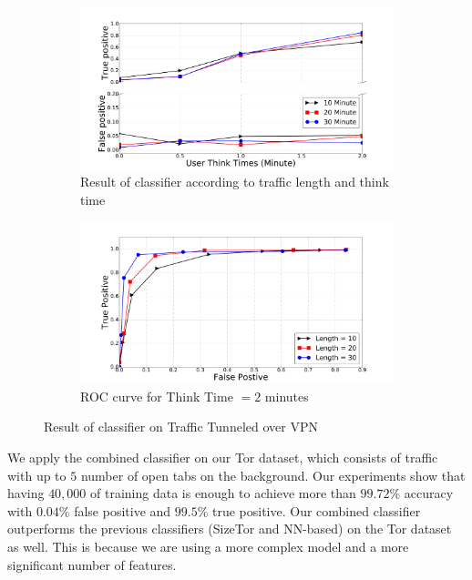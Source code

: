 \begin{figure}[!t]
\begin{subfigure}{.48\linewidth}
\centering
\includegraphics[width=\linewidth]{image/jan25/vpn_d2u.pdf}
\caption{Result of  classifier according to traffic length and think time}
\label{fig:tp}
\end{subfigure}
\centering
\begin{subfigure}{.48\linewidth}
\includegraphics[width=\linewidth]{image/jan25/roc_vpn_d2u.pdf}
\caption{ROC curve for Think Time $=2$ minutes}
\label{fig:fp}
\end{subfigure}
\caption{Result of  classifier on \bc Traffic Tunneled over VPN}
\label{fig:vpn}
\end{figure}
\fi





We apply the combined classifier on our Tor dataset, which consists of \bc traffic with up to $5$ number of open tabs on the background. Our experiments show that having $40,000$ of training data is enough to achieve more than $99.72\%$ accuracy with $0.04\%$ false positive and $99.5\%$ true positive. Our combined classifier outperforms the previous classifiers (SizeTor and NN-based) on the Tor dataset as well. This is because we are using a more complex model and a more significant number of features.


